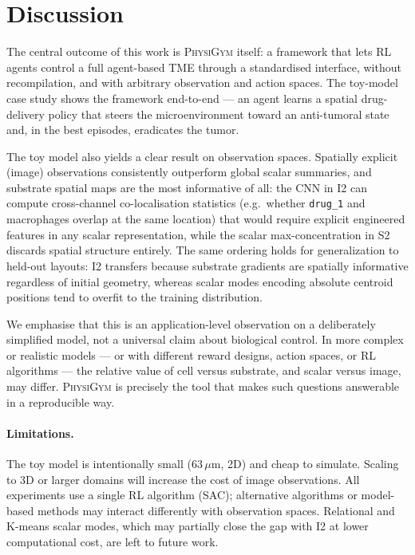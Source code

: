 \documentclass{article}
\newcommand{\physigym}{\textsc{PhysiGym}}
\begin{document}
\section{Discussion}

The central outcome of this work is \physigym{} itself: a framework that lets
RL agents control a full agent-based TME through a standardised interface,
without recompilation, and with arbitrary observation and action spaces. The
toy-model case study shows the framework end-to-end — an agent learns a spatial
drug-delivery policy that steers the microenvironment toward an anti-tumoral
state and, in the best episodes, eradicates the tumor.

The toy model also yields a clear result on observation spaces. Spatially
explicit (image) observations consistently outperform global scalar summaries,
and substrate spatial maps are the most informative of all: the CNN in I2 can
compute cross-channel co-localisation statistics (e.g.\ whether \texttt{drug\_1}
and macrophages overlap at the same location) that would require explicit
engineered features in any scalar representation, while the scalar
max-concentration in S2 discards spatial structure entirely. The same ordering
holds for generalization to held-out layouts: I2 transfers because substrate
gradients are spatially informative regardless of initial geometry, whereas
scalar modes encoding absolute centroid positions tend to overfit to the
training distribution.

We emphasise that this is an application-level observation on a deliberately
simplified model, not a universal claim about biological control. In more
complex or realistic models — or with different reward designs, action spaces,
or RL algorithms — the relative value of cell versus substrate, and scalar
versus image, may differ. \physigym{} is precisely the tool that makes such
questions answerable in a reproducible way.

\paragraph{Limitations.}
The toy model is intentionally small (63\,$\mu$m, 2D) and cheap to simulate.
Scaling to 3D or larger domains will increase the cost of image observations.
All experiments use a single RL algorithm (SAC); alternative algorithms or
model-based methods may interact differently with observation spaces.
Relational and K-means scalar modes, which may partially close the gap with I2
at lower computational cost, are left to future work.
\end{document}
